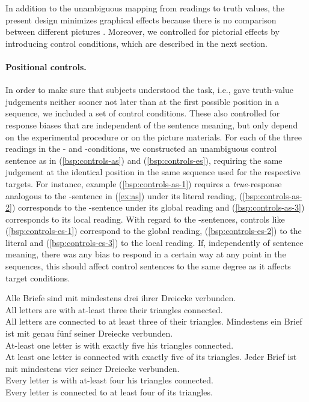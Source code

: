 \documentclass[fleqn,reqno,10pt,draft]{article}
\newcommand{\as}{\acro{as}}
\renewcommand{\es}{\acro{es}}
\begin{document}
In addition to the unambiguous mapping from readings to truth values,
the present design minimizes graphical effects because there is no
comparison between different pictures
\citep[c.f.][]{Tielvan-Tiel2012:Embedded-Scalar}. Moreover, we
controlled for pictorial effects by introducing control conditions,
which are described in the next section.


\paragraph{Positional controls.} In order to make sure that subjects understood
the task, i.e., gave truth-value judgements neither sooner not later
than at the first possible position in a sequence, we included a set
of control conditions. These also controlled for response biases that
are independent of the sentence meaning, but only depend on the
experimental procedure or on the picture materials. For each of the
three readings in the \as- and \es-conditions, we constructed an
unambiguous control sentence as in (\ref{bsp:controls-as}) and
(\ref{bsp:controls-es}), requiring the same judgement at the identical
position in the same sequence used for the respective targets. For
instance, example (\ref{bsp:controls-as-1}) requires a
\emph{true}-response analogous to the \as-sentence in (\ref{ex:as})
under its literal reading, (\ref{bsp:controls-as-2}) corresponds to
the \as-sentence under its global reading and
(\ref{bsp:controls-as-3}) corresponds to its local reading. With
regard to the \es-sentences, controls like (\ref{bsp:controls-es-1})
correspond to the global reading, (\ref{bsp:controls-es-2}) to the
literal and (\ref{bsp:controls-es-3}) to the local reading. If,
independently of sentence meaning, there was any bias to respond in a
certain way at any point in the sequences, this should affect control
sentences to the same degree as it affects target conditions.

\begin{exe}
  \ex \label{bsp:controls-as}
    \begin{xlist}
\ex \label{bsp:controls-as-1} \gll Alle Briefe sind mit mindestens drei ihrer Dreiecke verbunden.\\
  All letters are with at-least three their triangles connected.\\
  \trans All letters are connected to at least three of their triangles.
\ex \label{bsp:controls-as-2} \gll Mindestens ein Brief ist mit genau f\"unf seiner Dreiecke verbunden.\\
  At-least one letter is with exactly five his triangles connected.\\
  \trans At least one letter is connected with exactly five of its triangles.
\ex \label{bsp:controls-as-3} \gll Jeder Brief ist mit mindestens vier seiner Dreiecke verbunden.\\
  Every letter is with at-least four his triangles connected.\\
  \trans Every letter is connected to at least four of its triangles.
\end{xlist}
\end{exe}
\end{document}
